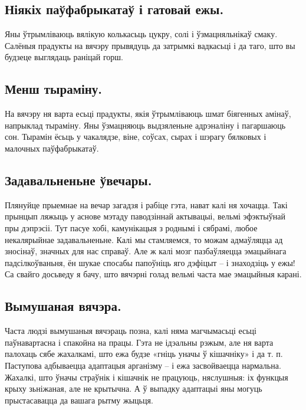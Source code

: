 \subsection{Ніякіх паўфабрыкатаў і гатовай ежы.}
Яны ўтрымліваюць вялікую колькасьць цукру, солі і ўзмацняльнікаў смаку. Салёныя прадукты на вячэру прывядуць да затрымкі вадкасьці і да таго, што вы будзеце выглядаць раніцай горш.

\subsection{Менш тыраміну.}
На вячэру ня варта есьці прадукты, якія ўтрымліваюць шмат біягенных амінаў, напрыклад тыраміну. Яны ўзмацняюць выдзяленьне адрэналіну і пагаршаюць сон. Тырамін ёсьць у чакалядзе, віне, соўсах, сырах і шэрагу бялковых і малочных паўфабрыкатаў.

\subsection{Задавальненьне ўвечары.}
Плянуйце прыемнае на вечар загадзя і рабіце гэта, нават калі ня хочацца. Такі прынцып ляжыць у аснове мэтаду паводзіннай актывацыі, вельмі эфэктыўнай пры дэпрэсіі. Тут пасуе хобі, камунікацыя з роднымі і сябрамі, любое некалярыйнае задавальненьне. Калі мы стамляемся, то можам адмаўляцца ад зносінаў, значных для нас справаў. Але ж калі мозг пазбаўляецца эмацыйнага падсілкоўваньня, ён шукае спосабы папоўніць яго дэфіцыт – і знаходзіць у ежы! Са свайго досьведу я бачу, што вячэрні голад вельмі часта мае эмацыйныя карані.

\subsection{Вымушаная вячэра.}
Часта людзі вымушаныя вячэраць позна, калі няма магчымасьці есьці паўнавартасна і спакойна на працы. Гэта не ідэальны рэжым, але ня варта палохаць сябе жахалкамі, што ежа будзе «гніць уначы ў кішачніку» і да т. п. Паступова адбываецца адаптацыя арганізму – і ежа засвойваецца нармальна. Жахалкі, што ўначы страўнік і кішачнік не працуюць, няслушныя: іх функцыя крыху зьніжаная, але не крытычна. А ў выпадку адаптацыі яны могуць прыстасавацца да вашага рытму жыцьця.
